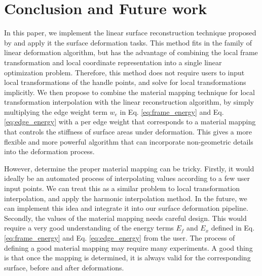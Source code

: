 \documentclass{6838publ}
\begin{document}
\section{Conclusion and Future work} In this paper, we implement the
linear surface reconstruction technique proposed by
\cite{wang2012linear} and apply it the surface deformation tasks. This
method fits in the family of linear deformation algorithm, but has the
advantage of combining the local frame transformation and local
coordinate representation into a single linear optimization
problem. Therefore, this method does not require users to input local
transformations of the handle points, and solve for local
transformations implicitly. We then propose to combine the material
mapping technique for local transformation interpolation with the
linear reconstruction algorithm, by simply multiplying the edge weight
term $w_{e}$ in Eq. \ref{eq:frame_energy} and Eq. \ref{eq:edge_energy}
with a per edge weight that corresponds to a material mapping that
controls the stiffness of surface areas under deformation. This gives
a more flexible and more powerful algorithm that can incorporate
non-geometric details into the deformation process.
\par However, determine the proper material mapping can be
tricky. Firstly, it would ideally be an automated process of
interpolating values according to a few user input points.  We can
treat this as a similar problem to local transformation interpolation,
and apply the harmonic interpolation method. In the future, we can
implement this idea and integrate it into our surface deformation
pipeline. Secondly, the values of the material mapping needs careful
design. This would require a very good understanding of the energy
terms $E_{f}$ and $E_{x}$ defined in Eq. \ref{eq:frame_energy} and
Eq. \ref{eq:edge_energy} from the user. The process of defining a good
material mapping may require many experiments. A good thing is that
once the mapping is determined, it is always valid for the
corresponding surface, before and after deformations.
 
\end{document}
